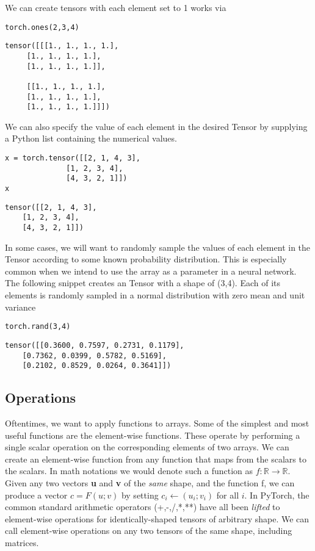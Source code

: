 \documentclass[]{article}
\begin{document}
We can create tensors with each element set to 1 works via

\begin{verbatim}
torch.ones(2,3,4)
\end{verbatim}

\begin{verbatim}
tensor([[[1., 1., 1., 1.],
	 [1., 1., 1., 1.],
	 [1., 1., 1., 1.]],
	
	 [[1., 1., 1., 1.],
	 [1., 1., 1., 1.],
	 [1., 1., 1., 1.]]])
\end{verbatim}

We can also specify the value of each element in the desired Tensor by supplying a Python list containing the numerical values.

\begin{verbatim}
x = torch.tensor([[2, 1, 4, 3],
	          [1, 2, 3, 4],
	          [4, 3, 2, 1]])
x
\end{verbatim}

\begin{verbatim}
tensor([[2, 1, 4, 3],
	[1, 2, 3, 4],
	[4, 3, 2, 1]])
\end{verbatim}

In some cases, we will want to randomly sample the values of each element in the Tensor according to some known probability distribution. This is especially common when we intend to use the array as a parameter in a neural network. The following snippet creates an Tensor with a shape of (3,4). Each of its elements is randomly sampled in a normal distribution with zero mean and unit variance

\begin{verbatim}
torch.rand(3,4)
\end{verbatim}

\begin{verbatim}
tensor([[0.3600, 0.7597, 0.2731, 0.1179],
	[0.7362, 0.0399, 0.5782, 0.5169],
	[0.2102, 0.8529, 0.0264, 0.3641]])
\end{verbatim}

\subsection{Operations}

Oftentimes, we want to apply functions to arrays. Some of the simplest and most useful functions are the element-wise functions. These operate by performing a single scalar operation on the corresponding elements of two arrays. We can create an element-wise function from any function that maps from the scalars to the scalars. In math notations we would denote such a function as $ f: \mathbb{R} \rightarrow \mathbb{R} $. Given any two vectors \textbf{u} and \textbf{v} of the \textit{same} shape, and the function f, we can produce a vector $ c=F(u;v) $ by setting $ c_i \leftarrow (u_i; v_i) $ for all $ i $. In PyTorch, the common standard arithmetic operators (+,-,/,*,**) have all been \textit{lifted} to element-wise operations for identically-shaped tensors of arbitrary shape. We can call element-wise operations on any two tensors of the same shape, including matrices.
\end{document}
